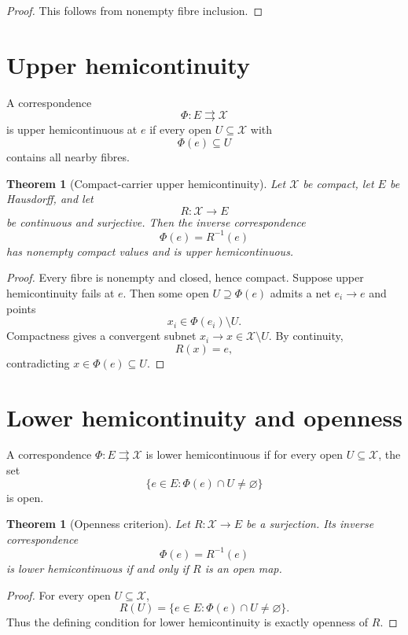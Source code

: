 \documentclass[11pt]{article}
\newtheorem{theorem}[definition]{Theorem}
\newcommand{\X}{\mathcal X}
\begin{document}
\begin{proof}
This follows from nonempty fibre inclusion.
\end{proof}

\section{Upper hemicontinuity}

A correspondence
\[
\Phi:E\rightrightarrows\X
\]
is upper hemicontinuous at \(e\) if every open \(U\subseteq\X\) with
\[
\Phi(e)\subseteq U
\]
contains all nearby fibres.

\begin{theorem}[Compact-carrier upper hemicontinuity]
\label{thm:uhc}
Let \(\X\) be compact, let \(E\) be Hausdorff, and let
\[
R:\X\to E
\]
be continuous and surjective. Then the inverse correspondence
\[
\Phi(e)=R^{-1}(e)
\]
has nonempty compact values and is upper hemicontinuous.
\end{theorem}

\begin{proof}
Every fibre is nonempty and closed, hence compact. Suppose upper
hemicontinuity fails at \(e\). Then some open \(U\supseteq\Phi(e)\) admits a
net \(e_i\to e\) and points
\[
x_i\in\Phi(e_i)\setminus U.
\]
Compactness gives a convergent subnet \(x_i\to x\in\X\setminus U\). By
continuity,
\[
R(x)=e,
\]
contradicting \(x\in\Phi(e)\subseteq U\).
\end{proof}

\section{Lower hemicontinuity and openness}

A correspondence \(\Phi:E\rightrightarrows\X\) is lower hemicontinuous if for
every open \(U\subseteq\X\), the set
\[
\{e\in E:\Phi(e)\cap U\neq\varnothing\}
\]
is open.

\begin{theorem}[Openness criterion]
Let \(R:\X\to E\) be a surjection. Its inverse correspondence
\[
\Phi(e)=R^{-1}(e)
\]
is lower hemicontinuous if and only if \(R\) is an open map.
\end{theorem}

\begin{proof}
For every open \(U\subseteq\X\),
\[
R(U)
=
\{e\in E:\Phi(e)\cap U\neq\varnothing\}.
\]
Thus the defining condition for lower hemicontinuity is exactly openness of
\(R\).
\end{proof}
\end{document}
